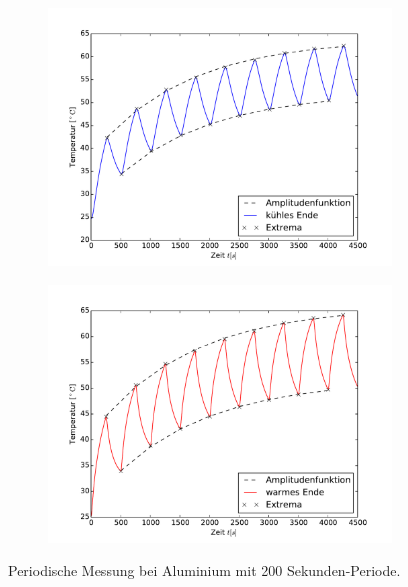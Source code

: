 \begin{figure}[h]
	\label{fig:M3Alu}
	\centering
	\begin{subfigure}{0.9\textwidth}
	\centering
	\includegraphics[width=\textwidth]{Bilder/M3_Alu_kuehl.pdf}
	\end{subfigure}
	\begin{subfigure}{0.9\textwidth}
	\centering
	\includegraphics[width=\textwidth]{Bilder/M3_Alu_warm.pdf}
	\end{subfigure}
	\caption{Periodische Messung bei Aluminium mit 200 Sekunden-Periode.}
\label{fig:M3Alu}
\end{figure}
